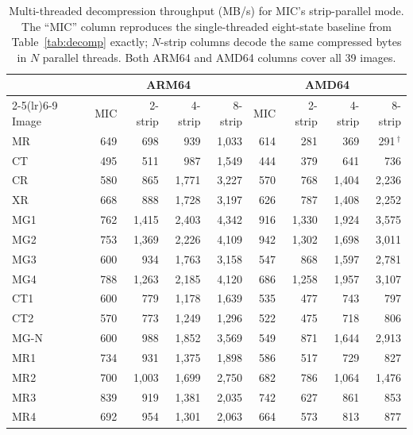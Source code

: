 \documentclass[journal]{IEEEtran}
\begin{document}
\begin{table}[htbp]
\centering
\caption{Multi-threaded decompression throughput (MB/s) for MIC's
strip-parallel mode. The ``MIC'' column reproduces the single-threaded
eight-state baseline from Table~\ref{tab:decomp} exactly; $N$-strip columns
decode the same compressed bytes in $N$ parallel threads. Both ARM64 and AMD64
columns cover all 39 images.}
\label{tab:pics}
\scriptsize
\begin{tabular}{l|rrrr|rrrr}
\toprule
 & \multicolumn{4}{c|}{ARM64} & \multicolumn{4}{c}{AMD64} \\
\cmidrule(lr){2-5}\cmidrule(lr){6-9}
Image & MIC & 2-strip & 4-strip & 8-strip & MIC & 2-strip & 4-strip & 8-strip \\
\midrule
MR                   & 649 & 698 & 939 & 1{,}033 & 614 & 281 & 369 & 291\,$^\dagger$ \\
CT                   & 495 & 511 & 987 & 1{,}549 & 444 & 379 & 641 & 736 \\
CR                   & 580 & 865 & 1{,}771 & 3{,}227 & 570 & 768 & 1{,}404 & 2{,}236 \\
XR                   & 668 & 888 & 1{,}728 & 3{,}197 & 626 & 787 & 1{,}408 & 2{,}252 \\
MG1                  & 762 & 1{,}415 & 2{,}403 & 4{,}342 & 916 & 1{,}330 & 1{,}924 & 3{,}575 \\
MG2                  & 753 & 1{,}369 & 2{,}226 & 4{,}109 & 942 & 1{,}302 & 1{,}698 & 3{,}011 \\
MG3                  & 600 & 934 & 1{,}763 & 3{,}158 & 547 & 868 & 1{,}597 & 2{,}781 \\
MG4                  & 788 & 1{,}263 & 2{,}185 & 4{,}120 & 686 & 1{,}258 & 1{,}957 & 3{,}107 \\
CT1                  & 600 & 779 & 1{,}178 & 1{,}639 & 535 & 477 & 743 & 797 \\
CT2                  & 570 & 773 & 1{,}249 & 1{,}296 & 522 & 475 & 718 & 806 \\
MG-N                 & 600 & 988 & 1{,}852 & 3{,}569 & 549 & 871 & 1{,}644 & 2{,}913 \\
MR1                  & 734 & 931 & 1{,}375 & 1{,}898 & 586 & 517 & 729 & 827 \\
MR2                  & 700 & 1{,}003 & 1{,}699 & 2{,}750 & 682 & 786 & 1{,}064 & 1{,}476 \\
MR3                  & 839 & 919 & 1{,}381 & 2{,}035 & 742 & 627 & 861 & 853 \\
MR4                  & 692 & 954 & 1{,}301 & 2{,}063 & 664 & 573 & 813 & 877 \\

\end{tabular}
\end{table}
\end{document}
